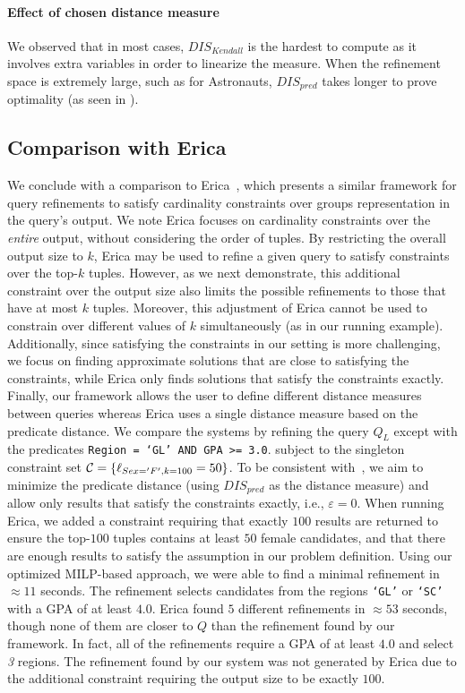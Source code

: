 \paragraph*{\textbf{Effect of chosen distance measure}}
We observed that in most cases, $DIS_{Kendall}$ is the hardest to compute as it involves extra variables in order to linearize the measure. When the refinement space is extremely large, such as for Astronauts,  $DIS_{pred}$ takes longer to prove optimality (as seen in ).

\subsection{Comparison with Erica \cite{ERICA,ERICAfull}}
\label{sec:erica_comparison}
We conclude with a comparison to 
Erica~\cite{ERICA,ERICAfull}, which presents a similar framework for query refinements to satisfy cardinality constraints over groups representation in the query's output. We note Erica focuses on cardinality constraints over the {\it entire} output, without considering the order of tuples. By restricting the overall output size to $k$, Erica may be used to refine a given query to satisfy constraints over the top-$k$ tuples. However, as we next demonstrate, this additional constraint over the output size also limits the possible refinements to those that have at most $k$ tuples. Moreover, this adjustment of Erica cannot be used to constrain over different values of $k$ simultaneously (as in our running example). Additionally, since satisfying the constraints in our setting is more challenging, we focus on finding approximate solutions that are close to satisfying the constraints, while Erica only finds solutions that satisfy the constraints exactly. Finally, our framework allows the user to define different distance measures between queries whereas Erica uses a single distance measure based on the predicate distance.
We compare the systems by refining the query $Q_L$ except with the predicates {\tt Region = `GL' AND GPA >= 3.0}.
subject to the singleton constraint set $\mathcal{C} = \{ \ell_{Sex='F', k=100} = 50 \}$. To be consistent with~\cite{ERICA,ERICAfull}, we aim to minimize the predicate distance (using $DIS_{pred}$ as the distance measure) and allow only results that satisfy the constraints exactly, i.e., $\varepsilon = 0$. When running Erica, we added a constraint requiring that exactly $100$ results are returned to ensure the top-$100$ tuples contains at least $50$ female candidates, and that there are enough results to satisfy the assumption in our problem definition. 
Using our optimized MILP-based approach, we were able to find a minimal refinement in $\approx 11$ seconds. The refinement selects candidates from the regions {\tt `GL'} or {\tt `SC'} with a GPA of at least $4.0$. Erica found $5$ different refinements in $\approx 53$ seconds, though none of them are closer to $Q$ than the refinement found by our framework. In fact, all of the refinements require a GPA of at least $4.0$ and select {\it 3} regions. The refinement found by our system was not generated by Erica due to the additional constraint requiring the output size to be exactly $100$.



